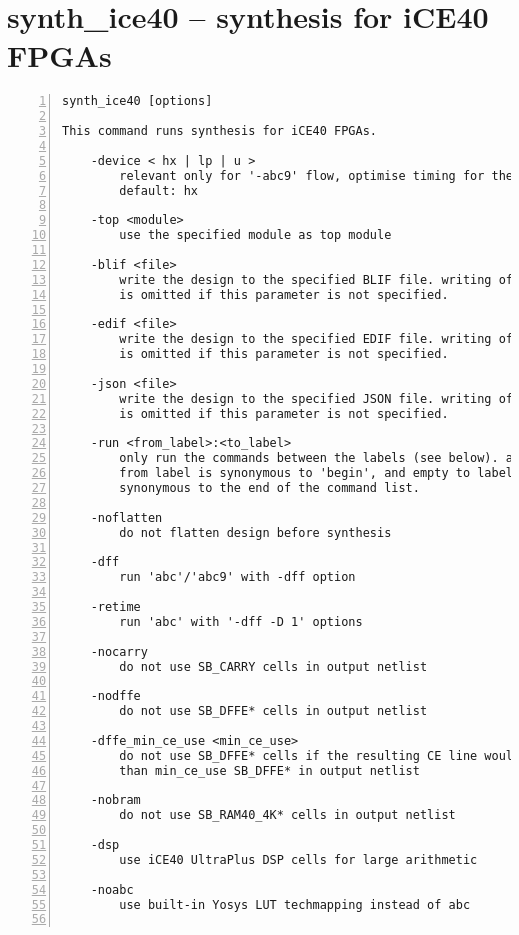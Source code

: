 \section{synth\_ice40 -- synthesis for iCE40 FPGAs}
\label{cmd:synth_ice40}
\begin{lstlisting}[numbers=left,frame=single]
    synth_ice40 [options]

This command runs synthesis for iCE40 FPGAs.

    -device < hx | lp | u >
        relevant only for '-abc9' flow, optimise timing for the specified device.
        default: hx

    -top <module>
        use the specified module as top module

    -blif <file>
        write the design to the specified BLIF file. writing of an output file
        is omitted if this parameter is not specified.

    -edif <file>
        write the design to the specified EDIF file. writing of an output file
        is omitted if this parameter is not specified.

    -json <file>
        write the design to the specified JSON file. writing of an output file
        is omitted if this parameter is not specified.

    -run <from_label>:<to_label>
        only run the commands between the labels (see below). an empty
        from label is synonymous to 'begin', and empty to label is
        synonymous to the end of the command list.

    -noflatten
        do not flatten design before synthesis

    -dff
        run 'abc'/'abc9' with -dff option

    -retime
        run 'abc' with '-dff -D 1' options

    -nocarry
        do not use SB_CARRY cells in output netlist

    -nodffe
        do not use SB_DFFE* cells in output netlist

    -dffe_min_ce_use <min_ce_use>
        do not use SB_DFFE* cells if the resulting CE line would go to less
        than min_ce_use SB_DFFE* in output netlist

    -nobram
        do not use SB_RAM40_4K* cells in output netlist

    -dsp
        use iCE40 UltraPlus DSP cells for large arithmetic

    -noabc
        use built-in Yosys LUT techmapping instead of abc


\end{lstlisting}
